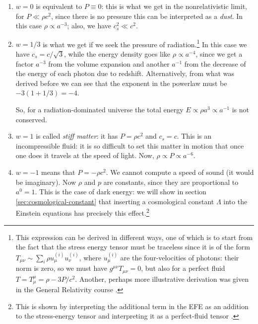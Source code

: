 \documentclass[main.tex]{subfiles}
\begin{document}
\begin{enumerate}
  \item \(w = 0\) is equivalent to \(P \equiv 0\): this is what we get in the nonrelativistic limit, for \(P \ll \rho c^2\), since there is no pressure this can be interpreted as a \emph{dust}. In this case \(\rho \propto a^{-3}\); also, we have \(c_s^2 \ll c^2\). 
  \item \(w = 1/3\) is what we get if we seek the pressure of radiation.\footnote{This expression can be derived in different ways, one of which is to start from the fact that the stress energy tensor must be traceless since it is of the form \(T_{\mu \nu } \sim \sum _{i} \rho u^{(i)}_{\mu } u^{(i)}_{\nu }\), where \(u_{\mu }^{(i)}\) are the four-velocities of photons: their norm is zero, so we must have \(g^{\mu \nu} T_{\mu \nu } = 0\), but also for a perfect fluid \(T = T^{\mu }_{\mu } = \rho - 3 P/c^2\). Another, perhaps more illustrative derivation was given in the General Relativity course \cite[pag. 86-87]{tissinoGeneralRelativityNotes2020}.}
  In this case we have \(c_s = c/ \sqrt{3}\), while the energy density goes like \(\rho \propto a^{-4}\), since we get a factor \(a^{-3}\) from the volume expansion and another \(a^{-1}\) from the decrease of the energy of each photon due to redshift. 
  Alternatively, from what was derived before we can see that the exponent in the powerlaw must be \(- 3(1+1/3) = -4\).
  
  So, for a radiation-dominated universe the total energy \(E \propto \rho a^{3} \propto a^{-1}\) is not conserved. 
  \item \(w=1\) is called \emph{stiff matter}: it has \(P = \rho c^2\) and  \(c_s = c\). 
  This is an incompressible fluid: it is so difficult to set this matter in motion that once one does it travels at the speed of light. Now, \(\rho \propto P \propto a^{-6}\). 
  \item \(w=-1\) means that \(P = - \rho c^2\). We cannot compute a speed of sound (it would be imaginary).
  Now \(\rho\) and \(p\) are constants, since they are proportional to \(a^{0}=1\). This is the case of dark energy: we will show in section \ref{sec:cosmological-constant} that inserting a cosmological constant \(\Lambda\) into the Einstein equations has precisely this effect.\footnote{This is shown by interpreting the additional term in the EFE as an addition to the stress-energy tensor and interpreting it as a perfect-fluid tensor \cite[eqs. 434-438]{tissinoGeneralRelativityNotes2020}.}
\end{enumerate}
\end{document}
